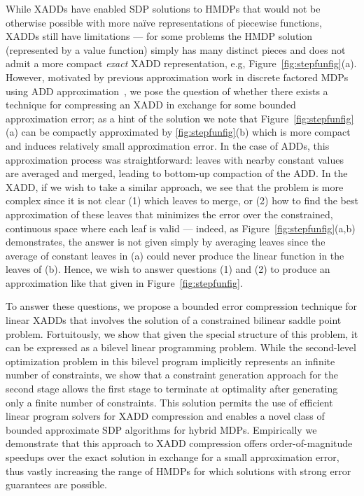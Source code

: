 While XADDs have enabled SDP solutions to HMDPs that would not be
otherwise possible with more na\"{i}ve representations of piecewise
functions, XADDs still have limitations --- for some problems the HMDP
solution (represented by a value function) simply has many distinct
pieces and does not admit a more compact \emph{exact} XADD
representation, e.g, Figure~\ref{fig:stepfunfig}(a).  However,
motivated by previous approximation work in discrete factored MDPs
using ADD approximation~\cite{apricodd}, we pose the question of
whether there exists a technique for compressing an XADD in exchange
for some bounded approximation error; as a hint of the solution we
note that Figure~\ref{fig:stepfunfig}(a) can be compactly approximated
by \ref{fig:stepfunfig}(b) which is more compact and induces
relatively small approximation error.  In the case of ADDs, this
approximation process was straightforward: leaves with nearby constant
values are averaged and merged, leading to bottom-up compaction of the
ADD.  In the XADD, if we wish to take a similar approach, we see that
the problem is more complex since it is not clear (1) which leaves to
merge, or (2) how to find the best approximation of these leaves that
minimizes the error over the constrained, continuous space where each
leaf is valid --- indeed, as Figure~\ref{fig:stepfunfig}(a,b)
demonstrates, the answer is not given simply by averaging leaves since
the average of constant leaves in (a) could never produce the linear
function in the leaves of (b).  Hence, we wish to answer questions (1)
and (2) to produce an approximation like that given in
Figure~\ref{fig:stepfunfig}.

To answer these questions, we propose a bounded error compression
technique for linear XADDs that involves the solution of a constrained
bilinear saddle point problem.  Fortuitously, we show that given the
special structure of this problem, it can be expressed as a bilevel
linear programming problem. %
While the second-level optimization problem in this
bilevel program implicitly represents an infinite number of
constraints, we show that a constraint generation approach for 
the second stage allows the first stage to terminate at
optimality after generating only a finite number of constraints.  This
solution permits the use of efficient linear program solvers for XADD
compression and enables a novel class of bounded approximate SDP
algorithms for hybrid MDPs.  Empirically we demonstrate that this
approach to XADD compression offers order-of-magnitude speedups over
the exact solution in exchange for a small approximation error, thus
vastly increasing the range of HMDPs for which solutions with strong
error guarantees are possible.

